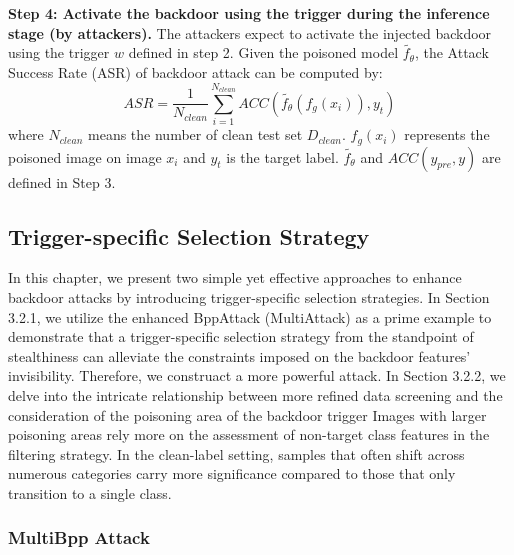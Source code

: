 \documentclass{article}
\begin{document}
\textbf{Step 4: Activate the backdoor using the trigger during the inference stage (by attackers).} The attackers expect to activate the injected backdoor using the trigger \(w\) defined in step 2. Given the poisoned model \(\tilde{f_{\theta}}\), the Attack Success Rate (ASR) of backdoor attack can be computed by:
\begin{equation}
ASR = \frac{1}{N_{clean}}\sum_{i=1}^{N_{clean}}{ACC(\tilde{f_{\theta}}(f_g(x_i)),y_t)}
\end{equation}
where \(N_{clean}\) means the number of clean test set \(D_{clean}\).  \(f_g(x_i)\) represents the poisoned image on image \(x_i\) and \(y_t\) is the target label. \(\tilde{f_{\theta}}\) and \(ACC(y_{pre},y)\) are defined in Step 3.
\subsection{Trigger-specific Selection Strategy}
In this chapter, we present two simple yet effective approaches to enhance backdoor attacks by introducing trigger-specific selection strategies. In Section 3.2.1, we utilize the enhanced BppAttack (MultiAttack) as a prime example to demonstrate that a trigger-specific selection strategy from the standpoint of stealthiness can alleviate the constraints imposed on the backdoor features' invisibility. Therefore, we construact a more powerful attack. In Section 3.2.2, we delve into the intricate relationship between more refined data screening and the consideration of the poisoning area of the backdoor trigger Images with larger poisoning areas rely more on the assessment of non-target class features in the filtering strategy. In the clean-label setting, samples that often shift across numerous categories carry more significance compared to those that only transition to a single class.
\subsubsection{MultiBpp Attack}
\end{document}
